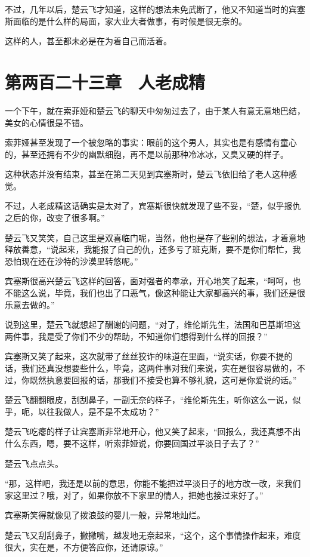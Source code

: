 不过，几年以后，楚云飞才知道，这样的想法未免武断了，他又不知道当时的宾塞斯面临的是什么样的局面，家大业大者做事，有时候是很无奈的。

这样的人，甚至都未必是在为着自己而活着。

\section{第两百二十三章　人老成精}

一个下午，就在索菲娅和楚云飞的聊天中匆匆过去了，由于某人有意无意地巴结，美女的心情很是不错。

索菲娅甚至发现了一个被忽略的事实：眼前的这个男人，其实也是有感情有童心的，甚至还拥有不少的幽默细胞，再不是以前那种冷冰冰，又臭又硬的样子。

这种状态并没有结束，甚至在第二天见到宾塞斯时，楚云飞依旧给了老人这种感觉。

不过，人老成精这话确实是太对了，宾塞斯很快就发现了些不妥，“楚，似乎报仇之后的你，改变了很多啊。”

楚云飞又笑笑，自己这里是双喜临门呢，当然，他也是存了些别的想法，才着意地释放善意，“说起来，我能报了自己的仇，还多亏了班克斯，要不是你们帮忙，我恐怕现在还在沙特的沙漠里转悠呢。”

宾塞斯很高兴楚云飞这样的回答，面对强者的奉承，开心地笑了起来，“呵呵，也不能这么说，毕竟，我们也出了口恶气，像这种能让大家都高兴的事，我们还是很乐意去做的。”

说到这里，楚云飞就想起了酬谢的问题，“对了，维伦斯先生，法国和巴基斯坦这两件事，我是受了你们不少的帮助，不知道你们想得到什么样的回报？”

宾塞斯又笑了起来，这次就带了丝丝狡诈的味道在里面，“说实话，你要不提的话，我们还真没想要些什么，毕竟，这两件事对我们来说，实在是很容易做的，不过，你既然执意要回报的话，那我们不接受也算不够礼貌，这可是你爱说的话。”

楚云飞翻翻眼皮，刮刮鼻子，一副无奈的样子，“维伦斯先生，听你这么一说，似乎，呃，以往我做人，是不是不太成功？”

楚云飞吃瘪的样子让宾塞斯非常地开心，他又笑了起来，“回报么，我还真想不出什么东西，嗯，要不这样，听索菲娅说，你要回国过平淡日子去了？”

楚云飞点点头。

“那，这样吧，我还是以前的意思，你能不能把过平淡日子的地方改一改，来我们家这里过？哦，对了，如果你放不下家里的情人，把她也接过来好了。”

宾塞斯笑得就像见了拨浪鼓的婴儿一般，异常地灿烂。

楚云飞又刮刮鼻子，撇撇嘴，越发地无奈起来，“这个，这个事情操作起来，难度很大，实在是，不方便答应你，还请原谅。”

